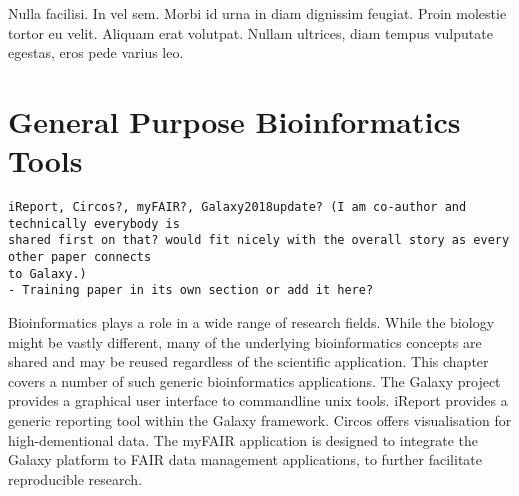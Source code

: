 \begin{savequote}[75mm]
Nulla facilisi. In vel sem. Morbi id urna in diam dignissim feugiat. Proin molestie tortor eu velit. Aliquam erat volutpat. Nullam ultrices, diam tempus vulputate egestas, eros pede varius leo.
\end{savequote}

\chapter{General Purpose Bioinformatics Tools}
\label{chapter:general}
\setcounter{figure}{-1}
\setcounter{table}{-1}
\setcounter{section}{-1}
\setcounter{NAT@ctr}{-1}

\begin{verbatim}
iReport, Circos?, myFAIR?, Galaxy2018update? (I am co-author and technically everybody is
shared first on that? would fit nicely with the overall story as every other paper connects
to Galaxy.)
- Training paper in its own section or add it here?
\end{verbatim}

Bioinformatics plays a role in a wide range of research fields. While the biology might be vastly different, many of the underlying bioinformatics concepts are shared and may be reused regardless of the scientific application. This chapter covers a number of such generic bioinformatics applications. The Galaxy project provides a graphical user interface to commandline unix tools. iReport provides a generic reporting tool within the Galaxy framework. Circos offers visualisation for high-dementional data. The myFAIR application is designed to integrate the Galaxy platform to FAIR data management applications, to further facilitate reproducible research.
